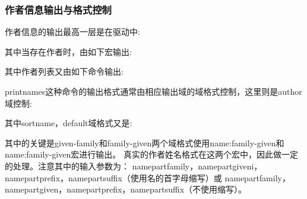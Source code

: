 \subsubsection{作者信息输出与格式控制}\label{sec:name:fmt:out}
作者信息的输出最高一层是在驱动中:
\begin{texlist}
\end{texlist}

其中当存在作者时，由如下宏输出:
\begin{texlist}
\end{texlist}

其中作者列表又由如下命令输出:
\begin{texlist}
\end{texlist}

printnames这种命令的输出格式通常由相应输出域的域格式控制，这里则是author域控制:
\begin{texlist}

\end{texlist}

其中sortname，default域格式又是:
\begin{texlist}

\end{texlist}

其中的关键是given-family和family-given两个域格式使用name:family-given和name:family-given宏进行输出。
真实的作者姓名格式在这两个宏中，因此做一定的处理。注意其中的输入参数为：
{namepartfamily}，{namepartgiveni}，{namepartprefix}，{namepartsuffix}（使用名的首字母缩写）或
{namepartfamily}，{namepartgiven}，{namepartprefix}，{namepartsuffix}（不使用缩写）。

